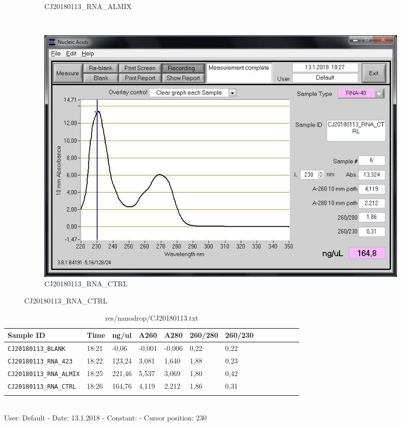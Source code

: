 \begin{figure}[H]
\begin{subfigure}[b]{0.3\textwidth}
        \caption{CJ20180113\_RNA\_ALMIX}
        \label{sfig:CJ20180113_RNA_ALMIX}
    \end{subfigure}
     ~ 
    \begin{subfigure}[b]{0.3\textwidth}
        \includegraphics[width=\textwidth]{graphics/screenshots/CJ20180113_RNA_CTRL.jpg}
        \caption{CJ20180113\_RNA\_CTRL}
        \label{sfig:CJ20180113_RNA_CTRL}
    \end{subfigure}
\end{figure}

\begin{table}
\caption{res/nanodrop/CJ20180113.txt}
\label{tab:}
\centering
\begin{tabular}{l l l l l l l l l l l l l }
\toprule
Sample ID & Time  & ng/ul  & A260  & A280  & 260/280  & 260/230  \\ \midrule
\texttt{CJ20180113\_BLANK} & 18:21 & -0,06 & -0,001 & -0,006 & 0,22 & 0,22 \\
\texttt{CJ20180113\_RNA\_423} & 18:22 & 123,24 & 3,081 & 1,640 & 1,88 & 0,23 \\
\texttt{CJ20180113\_RNA\_ALMIX} & 18:25 & 221,46 & 5,537 & 3,069 & 1,80 & 0,42 \\
\texttt{CJ20180113\_RNA\_CTRL} & 18:26 & 164,76 & 4,119 & 2,212 & 1,86 & 0,31 \\
\texttt{} &  &  &  &  &  &  \\

\bottomrule
\end{tabular}
\\
User: Default - Date: 13.1.2018 - Constant:  - Cursor position: 230 \
\end{table}